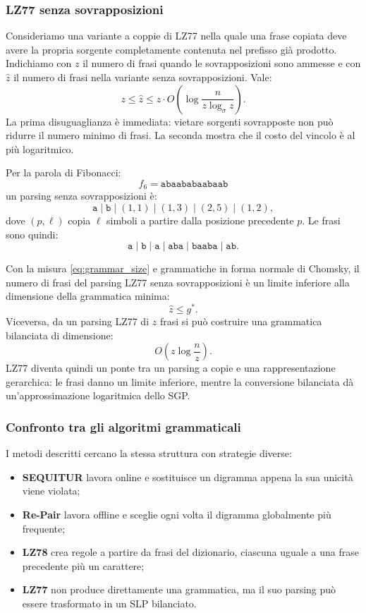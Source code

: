 \documentclass{article}
\theoremstyle{definition}
\numberwithin{equation}{section}
\begin{document}
\subsubsection{LZ77 senza sovrapposizioni}
Consideriamo una variante a coppie di LZ77 nella quale una frase copiata deve
avere la propria sorgente completamente contenuta nel prefisso già prodotto.
Indichiamo con $z$ il numero di frasi quando le sovrapposizioni sono ammesse e
con $\widehat z$ il numero di frasi nella variante senza sovrapposizioni. Vale:
\begin{equation}\label{eq:lz_overlap_relation}
    z
    \leq
    \widehat z
    \leq
    z\cdot
    O\left(
    \log
    \frac{n}{
        z\log_{\sigma}z
    }
    \right).
\end{equation}
La prima disuguaglianza è immediata: vietare sorgenti sovrapposte non può
ridurre il numero minimo di frasi. La seconda mostra che il costo del vincolo
è al più logaritmico.

Per la parola di Fibonacci:
\[
    f_6=\texttt{abaababaabaab}
\]
un parsing senza sovrapposizioni è:
\[
    \texttt{a}\mid
    \texttt{b}\mid
    (1,1)\mid
    (1,3)\mid
    (2,5)\mid
    (1,2),
\]
dove $(p,\ell)$ copia $\ell$ simboli a partire dalla posizione precedente
$p$. Le frasi sono quindi:
\[
    \texttt{a}\mid
    \texttt{b}\mid
    \texttt{a}\mid
    \texttt{aba}\mid
    \texttt{baaba}\mid
    \texttt{ab}.
\]

Con la misura \eqref{eq:grammar_size} e grammatiche in forma normale di
Chomsky, il numero di frasi del parsing LZ77 senza sovrapposizioni è un limite
inferiore alla dimensione della grammatica minima:
\[
    \widehat z\leq g^*.
\]
Viceversa, da un parsing LZ77 di $z$ frasi si può costruire una grammatica
bilanciata di dimensione:
\[
    O\left(
    z\log\frac{n}{z}
    \right).
\]
LZ77 diventa quindi un ponte tra un parsing a copie e una rappresentazione
gerarchica: le frasi danno un limite inferiore, mentre la conversione
bilanciata dà un'approssimazione logaritmica dello SGP.

\subsubsection{Confronto tra gli algoritmi grammaticali}
I metodi descritti cercano la stessa struttura con strategie diverse:
\begin{itemize}
    \item \textbf{SEQUITUR} lavora online e sostituisce un digramma appena la
          sua unicità viene violata;
    \item \textbf{Re-Pair} lavora offline e sceglie ogni volta il digramma
          globalmente più frequente;
    \item \textbf{LZ78} crea regole a partire da frasi del dizionario, ciascuna
          uguale a una frase precedente più un carattere;
    \item \textbf{LZ77} non produce direttamente una grammatica, ma il suo
          parsing può essere trasformato in un SLP bilanciato.
\end{itemize}
\end{document}
